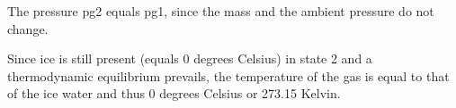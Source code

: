 The pressure pg2 equals pg1, since the mass and the ambient pressure do not change.

Since ice is still present (equals 0 degrees Celsius) in state 2 and a thermodynamic equilibrium prevails, the temperature of the gas is equal to that of the ice water and thus 0 degrees Celsius or 273.15 Kelvin.
